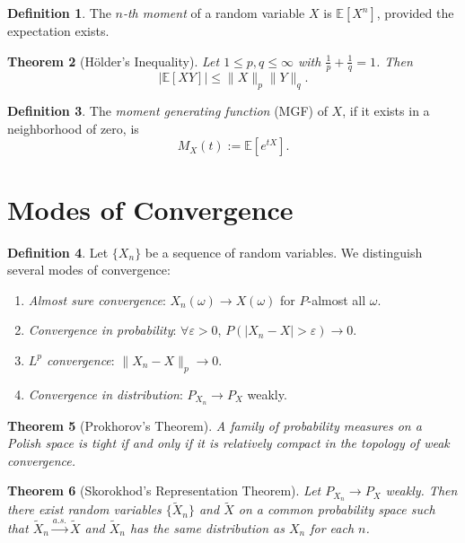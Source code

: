\documentclass[11pt]{amsart}
\newtheorem{theorem}{Theorem}[section]
\theoremstyle{definition}
\newtheorem{definition}[theorem]{Definition}
\theoremstyle{remark}
\begin{document}
\begin{definition}
	The \emph{$n$-th moment} of a random variable $X$ is $\mathbb{E}[X^n]$, provided the expectation exists.
\end{definition}

\begin{theorem}[Hölder's Inequality]
	Let $1 \leq p, q \leq \infty$ with $\frac{1}{p} + \frac{1}{q} = 1$. Then
	\[
		|\mathbb{E}[XY]| \leq \|X\|_p \|Y\|_q.
	\]
\end{theorem}

\begin{definition}
	The \emph{moment generating function} (MGF) of $X$, if it exists in a neighborhood of zero, is
	\[
		M_X(t) := \mathbb{E}[e^{tX}].
	\]
\end{definition}

\section{Modes of Convergence}

\begin{definition}
	Let $\{X_n\}$ be a sequence of random variables. We distinguish several modes of convergence:
	\begin{enumerate}[label=(\roman*)]
		\item \emph{Almost sure convergence}: $X_n(\omega) \to X(\omega)$ for $P$-almost all $\omega$.
		\item \emph{Convergence in probability}: $\forall \varepsilon>0$, $P(|X_n - X| > \varepsilon) \to 0$.
		\item \emph{$L^p$ convergence}: $\|X_n - X\|_p \to 0$.
		\item \emph{Convergence in distribution}: $P_{X_n} \to P_X$ weakly.
	\end{enumerate}
\end{definition}

\begin{theorem}[Prokhorov's Theorem]
	A family of probability measures on a Polish space is tight if and only if it is relatively compact in the topology of weak convergence.
\end{theorem}

\begin{theorem}[Skorokhod's Representation Theorem]
	Let $P_{X_n} \to P_X$ weakly. Then there exist random variables $\{\tilde{X}_n\}$ and $\tilde{X}$ on a common probability space such that $\tilde{X}_n \xrightarrow{a.s.} \tilde{X}$ and $\tilde{X}_n$ has the same distribution as $X_n$ for each $n$.
\end{theorem}
\end{document}
